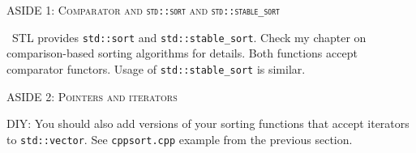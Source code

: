 \textsc{ASIDE 1: Comparator and
\textnormal{\texttt{std::sort}} and \textnormal{\texttt{std::stable\_sort}}}

\cpp\ STL provides
\verb!std::sort!
and \verb!std::stable_sort!.
Check my chapter on comparison-based sorting algorithms for details.
Both functions accept comparator functors.
Usage of \verb!std::stable_sort! is similar.

\newpage
\textsc{ASIDE 2: Pointers and iterators}

DIY: You should also add versions of your sorting functions that
accept iterators to \verb!std::vector!.
See \verb!cppsort.cpp! example from the previous section.

